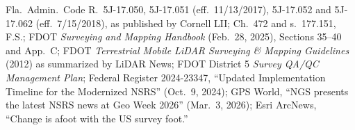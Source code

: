\begin{tcolorbox}[base,colback=gray!4,colframe=grayx,title={SOURCES FOR THIS MODULE}]
\footnotesize
Fla.\ Admin.\ Code R.\ 5J-17.050, 5J-17.051 (eff.\ 11/13/2017), 5J-17.052 and 5J-17.062 (eff.\ 7/15/2018), as published by Cornell LII; Ch.\ 472 and s.\ 177.151, F.S.; FDOT \emph{Surveying and Mapping Handbook} (Feb.\ 28, 2025), Sections 35--40 and App.\ C; FDOT \emph{Terrestrial Mobile LiDAR Surveying \& Mapping Guidelines} (2012) as summarized by LiDAR News; FDOT District 5 \emph{Survey QA/QC Management Plan}; Federal Register 2024-23347, ``Updated Implementation Timeline for the Modernized NSRS'' (Oct.\ 9, 2024); GPS World, ``NGS presents the latest NSRS news at Geo Week 2026'' (Mar.\ 3, 2026); Esri ArcNews, ``Change is afoot with the US survey foot.''
\end{tcolorbox}
